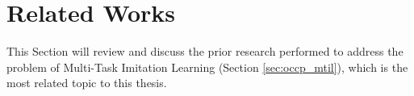 \section{Related Works}
\label{sec:occp_related_works}
This Section will review and discuss the prior research performed to address the problem of Multi-Task Imitation Learning (Section \ref{sec:occp_mtil}), which is the most related topic to this thesis. 



% 